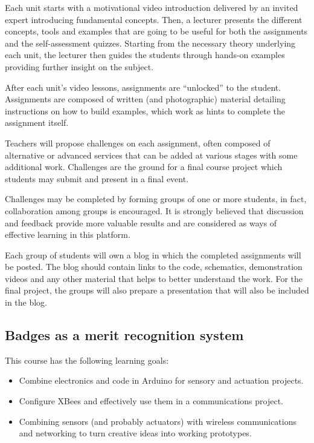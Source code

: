 \documentclass[a4paper,oneside]{book}   %
\begin{document}
Each unit starts with a motivational video introduction delivered by an invited expert introducing fundamental concepts.
Then, a lecturer presents the different concepts, tools and examples that are going to be useful for both the assignments and the self-assessment quizzes.
Starting from the necessary theory underlying each unit, the lecturer then guides the students through hands-on examples providing further insight on the subject.

After each unit's video lessons, assignments are ``unlocked'' to the student. Assignments are composed of written (and photographic) material detailing instructions on how to build examples, which work as hints to complete the assignment itself.


Teachers will propose challenges on each assignment, often composed of alternative or advanced services that can be added at various stages with some additional work. Challenges are the ground for a final course project which students may submit and present in a final event.

Challenges may be completed by forming groups of one or more students, in fact, collaboration among groups is encouraged. It is strongly believed that discussion and feedback provide more valuable results and are considered as ways of effective learning in this platform.

Each group of students will own a blog in which the completed assignments will be posted.
The blog should contain links to the code, schematics, demonstration videos and any other material that helps to better understand the work.
For the final project, the groups will also prepare a presentation that will also be included in the blog.

\subsection{Badges as a merit recognition system}

This course has the following learning goals:
\begin{itemize}
\item Combine electronics and code in Arduino for sensory and actuation projects.
\item Configure XBees and effectively use them in a communications project.
\item Combining sensors (and probably actuators) with wireless communications and networking to turn creative ideas into working prototypes.
\end{itemize}
\end{document}
